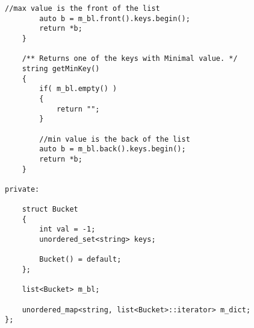 \begin{lstlisting}[style=customc, caption={Double Linked List and Iterator For Value In Hash Map}]
        //max value is the front of the list
        auto b = m_bl.front().keys.begin();
        return *b;
    }

    /** Returns one of the keys with Minimal value. */
    string getMinKey()
    {
        if( m_bl.empty() )
        {
            return "";
        }

        //min value is the back of the list
        auto b = m_bl.back().keys.begin();
        return *b;
    }

private:

    struct Bucket
    {
        int val = -1;
        unordered_set<string> keys;

        Bucket() = default;
    };

    list<Bucket> m_bl;

    unordered_map<string, list<Bucket>::iterator> m_dict;
};
\end{lstlisting}